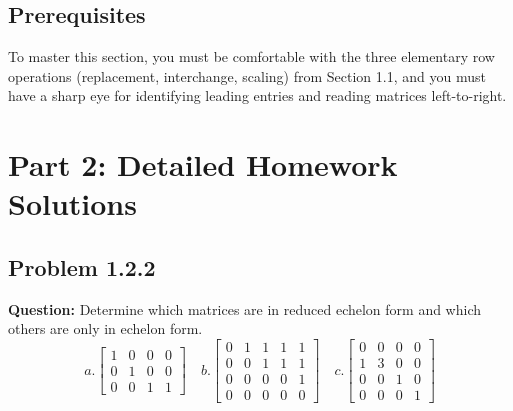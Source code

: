 \documentclass[11pt]{article}
\begin{document}
\subsection{Prerequisites}
To master this section, you must be comfortable with the three elementary row operations (replacement, interchange, scaling) from Section 1.1, and you must have a sharp eye for identifying leading entries and reading matrices left-to-right.

\newpage
\section{Part 2: Detailed Homework Solutions}

\subsection*{Problem 1.2.2}
\textbf{Question:} Determine which matrices are in reduced echelon form and which others are only in echelon form.
\[ a. \begin{bmatrix} 1 & 0 & 0 & 0 \\ 0 & 1 & 0 & 0 \\ 0 & 0 & 1 & 1 \end{bmatrix} \quad b. \begin{bmatrix} 0 & 1 & 1 & 1 & 1 \\ 0 & 0 & 1 & 1 & 1 \\ 0 & 0 & 0 & 0 & 1 \\ 0 & 0 & 0 & 0 & 0 \end{bmatrix} \quad c. \begin{bmatrix} 0 & 0 & 0 & 0 \\ 1 & 3 & 0 & 0 \\ 0 & 0 & 1 & 0 \\ 0 & 0 & 0 & 1 \end{bmatrix} \]
\end{document}

